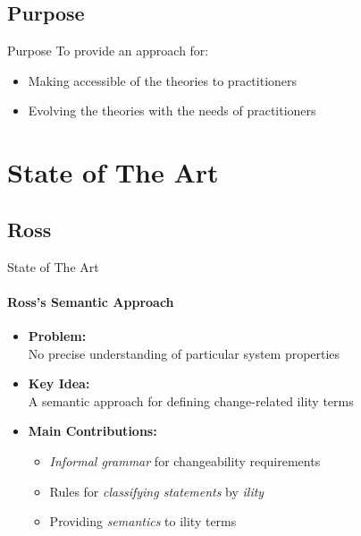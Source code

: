 \documentclass[xcolor=x11names,compress]{beamer}
\renewcommand{\(}{\begin{columns}}
\renewcommand{\)}{\end{columns}}
\newcommand{\<}[1]{\begin{column}{#1}}
\renewcommand{\>}{\end{column}}
\begin{document}
\subsection{Purpose}
\begin{frame}{Purpose}
To provide an approach for:
\begin{itemize}
\item Making accessible of the theories to practitioners
\item Evolving the theories with the needs of practitioners
\end{itemize}
\end{frame}

\section{State of The Art}
\subsection{Ross}
\begin{frame}{State of The Art}
\framesubtitle{Ross's Semantic Approach \cite{Ross:changeability}}
\begin{itemize}
\item \textbf{Problem:}\\No precise understanding of particular system properties
\item \textbf{Key Idea:} \\A semantic approach for defining change-related ility terms
\item \textbf{Main Contributions:}
\begin{itemize}
\item {\em Informal grammar} for changeability requirements
\item Rules for {\em classifying statements} by {\em ility}
\item Providing {\em semantics} to ility terms
\end{itemize}
\end{itemize}
\end{frame}

\end{document}
